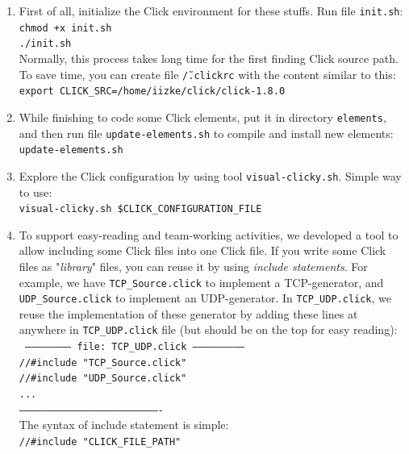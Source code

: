 \documentclass[a4paper]{article}
\begin{document}
      \begin{enumerate}
      	\item 
      	  First of all, initialize the Click environment for these stuffs. Run file \texttt{init.sh}: \\
      	    \texttt{chmod +x init.sh\\
      	    ./init.sh}\\
      	  Normally, this process takes long time for the first finding Click source path. To save time, you can create file \texttt{\~/.clickrc} with the content similar to this:\\
            \texttt{export CLICK\_SRC=/home/iizke/click/click-1.8.0}
        
        \item 
          While finishing to code some Click elements, put it in directory \texttt{elements}, and then run file \texttt{update-elements.sh} to compile and install new elements: \\
    \texttt{update-elements.sh}
        \item
        Explore the Click configuration by using tool \texttt{visual-clicky.sh}. Simple way to use: \\    
    \texttt{visual-clicky.sh \$CLICK\_CONFIGURATION\_FILE}
        \item
        To support easy-reading and team-working activities, we developed a tool to allow including some Click files into one Click file. If you write some Click files as "\textit{library}" files, you can reuse it by using \textit{include statements}. For example, we have \texttt{TCP\_Source.click} to implement a TCP-generator, and \texttt{UDP\_Source.click} to implement an UDP-generator. In \texttt{TCP\_UDP.click}, we reuse the implementation of these generator by adding these lines at anywhere in \texttt{TCP\_UDP.click} file (but should be on the top for easy reading): \\
        \texttt{
  ------------------------ file: TCP\_UDP.click ---------------------------\\
  //#include "TCP\_Source.click"\\
  //#include "UDP\_Source.click"\\
  ...\\
  -------------------------------------------------------------------------}\\
  The syntax of include statement is simple:\\
          \texttt{//\#include "CLICK\_FILE\_PATH"}\\

\end{enumerate}
\end{document}
